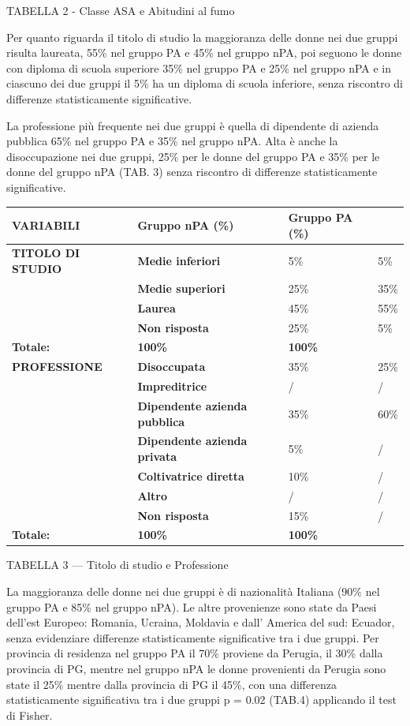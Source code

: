 \documentclass[]{article}
\begin{document}
TABELLA 2 - Classe ASA e Abitudini al fumo

Per quanto riguarda il titolo di studio la maggioranza delle donne nei
due gruppi risulta laureata, 55\% nel gruppo PA e 45\% nel gruppo nPA,
poi seguono le donne con diploma di scuola superiore 35\% nel gruppo PA
e 25\% nel gruppo nPA e in ciascuno dei due gruppi il 5\% ha un diploma
di scuola inferiore, senza riscontro di differenze statisticamente
significative.

La professione più frequente nei due gruppi è quella di dipendente di
azienda pubblica 65\% nel gruppo PA e 35\% nel gruppo nPA. Alta è anche
la disoccupazione nei due gruppi, 25\% per le donne del gruppo PA e 35\%
per le donne del gruppo nPA (TAB. 3) senza riscontro di differenze
statisticamente significative.

\begin{longtable}[]{@{}llll@{}}
\toprule
\textbf{VARIABILI} & \textbf{Gruppo nPA (\%)} & \textbf{Gruppo PA (\%)}
&\tabularnewline
\midrule
\endhead
\textbf{TITOLO DI STUDIO} & \textbf{Medie inferiori} & 5\% &
5\%\tabularnewline
& \textbf{Medie superiori} & 25\% & 35\%\tabularnewline
& \textbf{Laurea} & 45\% & 55\%\tabularnewline
& \textbf{Non risposta} & 25\% & 5\%\tabularnewline
\textbf{Totale:} & \textbf{100\%} & \textbf{100\%} &\tabularnewline
\textbf{PROFESSIONE} & \textbf{Disoccupata} & 35\% & 25\%\tabularnewline
& \textbf{Impreditrice} & / & /\tabularnewline
& \textbf{Dipendente azienda pubblica} & 35\% & 60\%\tabularnewline
& \textbf{Dipendente azienda privata} & 5\% & /\tabularnewline
& \textbf{Coltivatrice diretta} & 10\% & /\tabularnewline
& \textbf{Altro} & / & /\tabularnewline
& \textbf{Non risposta} & 15\% & /\tabularnewline
\textbf{Totale:} & \textbf{100\%} & \textbf{100\%} &\tabularnewline
\bottomrule
\end{longtable}

TABELLA 3 --- Titolo di studio e Professione

La maggioranza delle donne nei due gruppi è di nazionalità Italiana
(90\% nel gruppo PA e 85\% nel gruppo nPA). Le altre provenienze sono
state da Paesi dell'est Europeo: Romania, Ucraina, Moldavia e dall'
America del sud: Ecuador, senza evidenziare differenze statisticamente
significative tra i due gruppi. Per provincia di residenza nel gruppo PA
il 70\% proviene da Perugia, il 30\% dalla provincia di PG, mentre nel
gruppo nPA le donne provenienti da Perugia sono state il 25\% mentre
dalla provincia di PG il 45\%, con una differenza statisticamente
significativa tra i due gruppi p = 0.02 (TAB.4) applicando il test di
Fisher.
\end{document}
